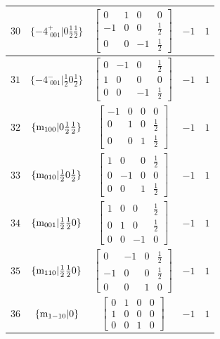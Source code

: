 \documentclass[fleqn,8pt]{jsarticle}
\begin{document}
\begin{longtable}{ccccc}
$ 30 $ & $ \{-4^{+}_{\,\,001}|0 \frac{1}{2} \frac{1}{2}\} $ & $ \begin{bmatrix} 0 & 1 & 0 & 0 \\ -1 & 0 & 0 & \frac{1}{2} \\ 0 & 0 & -1 & \frac{1}{2} \end{bmatrix} $ & $ -1 $ & $ 1 $ \\ \hline
$ 31 $ & $ \{-4^{-}_{\,\,001}|\frac{1}{2} 0 \frac{1}{2}\} $ & $ \begin{bmatrix} 0 & -1 & 0 & \frac{1}{2} \\ 1 & 0 & 0 & 0 \\ 0 & 0 & -1 & \frac{1}{2} \end{bmatrix} $ & $ -1 $ & $ 1 $ \\ \hline
$ 32 $ & $ \{{\rm m}_{100}|0 \frac{1}{2} \frac{1}{2}\} $ & $ \begin{bmatrix} -1 & 0 & 0 & 0 \\ 0 & 1 & 0 & \frac{1}{2} \\ 0 & 0 & 1 & \frac{1}{2} \end{bmatrix} $ & $ -1 $ & $ 1 $ \\ \hline
$ 33 $ & $ \{{\rm m}_{010}|\frac{1}{2} 0 \frac{1}{2}\} $ & $ \begin{bmatrix} 1 & 0 & 0 & \frac{1}{2} \\ 0 & -1 & 0 & 0 \\ 0 & 0 & 1 & \frac{1}{2} \end{bmatrix} $ & $ -1 $ & $ 1 $ \\ \hline
$ 34 $ & $ \{{\rm m}_{001}|\frac{1}{2} \frac{1}{2} 0\} $ & $ \begin{bmatrix} 1 & 0 & 0 & \frac{1}{2} \\ 0 & 1 & 0 & \frac{1}{2} \\ 0 & 0 & -1 & 0 \end{bmatrix} $ & $ -1 $ & $ 1 $ \\ \hline
$ 35 $ & $ \{{\rm m}_{110}|\frac{1}{2} \frac{1}{2} 0\} $ & $ \begin{bmatrix} 0 & -1 & 0 & \frac{1}{2} \\ -1 & 0 & 0 & \frac{1}{2} \\ 0 & 0 & 1 & 0 \end{bmatrix} $ & $ -1 $ & $ 1 $ \\ \hline
$ 36 $ & $ \{{\rm m}_{1-10}|0\} $ & $ \begin{bmatrix} 0 & 1 & 0 & 0 \\ 1 & 0 & 0 & 0 \\ 0 & 0 & 1 & 0 \end{bmatrix} $ & $ -1 $ & $ 1 $ \\ \hline

\end{longtable}
\end{document}

